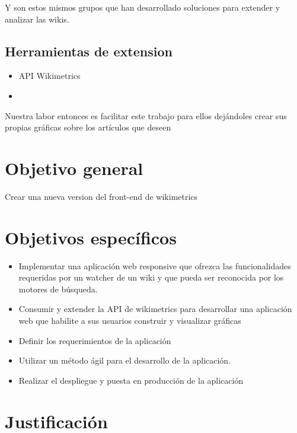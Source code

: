 
Y son estos mismos grupos que han desarrollado soluciones para extender y analizar las wikis.


\subsection*{Herramientas de extension }
\begin{itemize}
    \item API Wikimetrics
    \item
\end{itemize}


Nuestra labor entonces es facilitar este trabajo para ellos dejándoles crear sus propias gráficas sobre los artículos que deseen

\section{Objetivo general}
Crear una nueva version del front-end de wikimetrics


\section{Objetivos específicos}

\begin{itemize}{}{}

    \item Implementar una aplicación web responsive que ofrezca las funcionalidades requeridas por un watcher de un wiki y que pueda ser reconocida por los motores de búsqueda.
    \item Consumir y extender la API de wikimetrics para desarrollar una aplicación web que habilite a sus usuarios construir y visualizar gráficas
    \item Definir los requerimientos de la aplicación
    \item Utilizar un método ágil para el desarrollo de la aplicación.
    \item Realizar el despliegue y puesta en producción de la aplicación

\end{itemize}


\section{Justificación}

